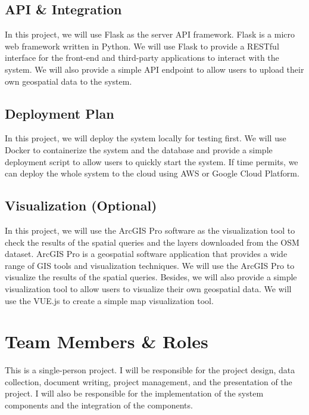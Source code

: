 \documentclass{article}
\begin{document}
\subsection{API \& Integration}

In this project, we will use Flask as the server API framework. Flask is a micro web framework written in Python. We will use Flask to provide a RESTful interface for the front-end and third-party applications to interact with the system. We will also provide a simple API endpoint to allow users to upload their own geospatial data to the system.

\subsection{Deployment Plan}

In this project, we will deploy the system locally for testing first. We will use Docker to containerize the system and the database and provide a simple deployment script to allow users to quickly start the system. If time permits, we can deploy the whole system to the cloud using AWS or Google Cloud Platform.

\subsection{Visualization (Optional)}
In this project, we will use the ArcGIS Pro software as the visualization tool to check the results of the spatial queries and the layers downloaded from the OSM dataset. ArcGIS Pro is a geospatial software application that provides a wide range of GIS tools and visualization techniques. We will use the ArcGIS Pro to visualize the results of the spatial queries. Besides, we will also provide a simple visualization tool to allow users to visualize their own geospatial data. We will use the VUE.js to create a simple map visualization tool.


\section{Team Members \& Roles}

This is a single-person project. I will be responsible for the project design, data collection, document writing, project management, and the presentation of the project. I will also be responsible for the implementation of the system components and the integration of the components.
\end{document}
